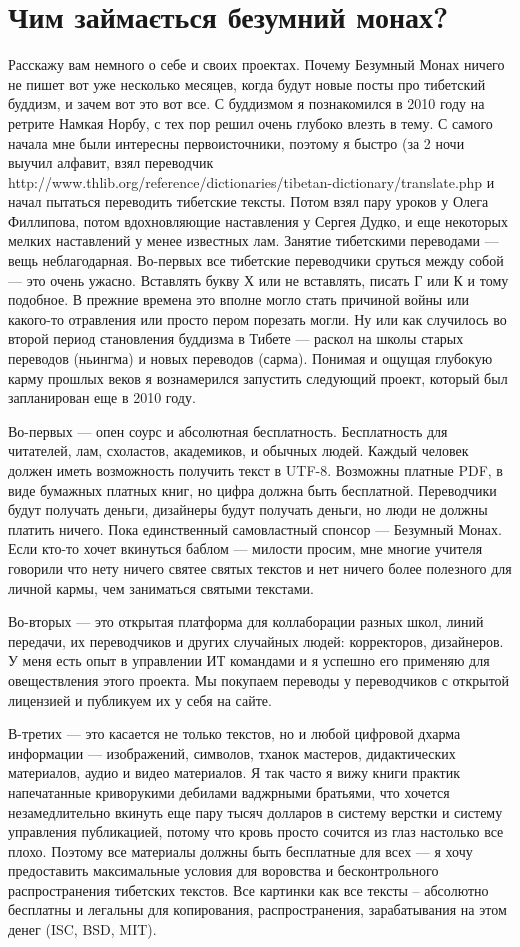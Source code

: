 \section{Чим займається безумний монах?}

Расскажу вам немного о себе и своих проектах. Почему Безумный Монах ничего не пишет вот уже несколько месяцев, когда будут новые посты про тибетский буддизм, и зачем вот это вот все. С буддизмом я познакомился в 2010 году на ретрите Намкая Норбу, с тех пор решил очень глубоко влезть в тему. С самого начала мне были интересны первоисточники, поэтому я быстро (за 2 ночи выучил алфавит, взял переводчик http://www.thlib.org/reference/dictionaries/tibetan-dictionary/translate.php и начал пытаться переводить тибетские тексты. Потом взял пару уроков у Олега Филлипова, потом вдохновляющие наставления у Сергея Дудко, и еще некоторых мелких наставлений у менее известных лам. Занятие тибетскими переводами — вещь неблагодарная. Во-первых все тибетские переводчики сруться между собой — это очень ужасно. Вставлять букву Х или не вставлять, писать Г или К и тому подобное. В прежние времена это вполне могло стать причиной войны или какого-то отравления или просто пером порезать могли. Ну или как случилось во второй период становления буддизма в Тибете — раскол на школы старых переводов (ньингма) и новых переводов (сарма). Понимая и ощущая глубокую карму прошлых веков я вознамерился запустить следующий проект, который был запланирован еще в 2010 году.

Во-первых — опен соурс и абсолютная бесплатность. Бесплатность для читателей, лам, схоластов, академиков, и обычных людей. Каждый человек должен иметь возможность получить текст в UTF-8. Возможны платные PDF, в виде бумажных платных книг, но цифра должна быть бесплатной. Переводчики будут получать деньги, дизайнеры будут получать деньги, но люди не должны платить ничего. Пока единственный самовластный спонсор — Безумный Монах. Если кто-то хочет вкинуться баблом — милости просим, мне многие учителя говорили что нету ничего святее святых текстов и нет ничего более полезного для личной кармы, чем заниматься святыми текстами.

Во-вторых — это открытая платформа для коллаборации разных школ, линий передачи, их переводчиков и других случайных людей: корректоров, дизайнеров. У меня есть опыт в управлении ИТ командами и я успешно его применяю для овеществления этого проекта. Мы покупаем переводы у переводчиков с открытой лицензией и публикуем их у себя на сайте.

В-третих — это касается не только текстов, но и любой цифровой дхарма информации — изображений, символов, тханок мастеров, дидактических материалов, аудио и видео материалов. Я так часто я вижу книги практик напечатанные криворукими дебилами ваджрными братьями, что хочется незамедлительно вкинуть еще пару тысяч долларов в систему верстки и систему управления публикацией, потому что кровь просто сочится из глаз настолько все плохо. Поэтому все материалы должны быть бесплатные для всех — я хочу предоставить максимальные условия для воровства и бесконтрольного распространения тибетских текстов. Все картинки как все тексты – абсолютно бесплатны и легальны для копирования, распространения, зарабатывания на этом денег (ISC, BSD, MIT).

